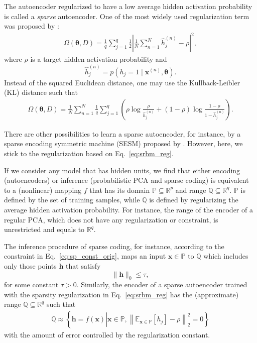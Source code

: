 \documentclass{now}
\newcommand{\vect}[1]{\mathbf{#1}}
\newcommand{\vects}[1]{\boldsymbol{#1}}
\newcommand{\vh}[0]{\vect{h}}
\newcommand{\vx}[0]{\vect{x}}
\newcommand{\TT}[0]{{\vects{\theta}}}
\newcommand{\QQ}[0]{\mathbb{Q}}
\newcommand{\PP}[0]{\mathbb{P}}
\newcommand{\RR}[0]{\mathbb{R}}
\newcommand{\E}[0]{\mathbb{E}}
\begin{document}
The autoencoder regularized to have a low average hidden
activation probability is called a \textit{sparse}
autoencoder. One of the most widely used regularization term
was proposed by \citet{Lee2007}:
\begin{align}
    \label{eq:srbm_reg}
    \Omega(\TT, D) = \frac{1}{q} \sum_{j=1}^q \frac{1}{2} \left|
    \frac{1}{N} \sum_{n=1}^N \hat{h}_j^{(n)} - \rho
    \right|^2,
\end{align}
where $\rho$ is a target hidden activation probability and
\[
\hat{h}_j^{(n)} = p(h_j = 1 \mid \vx^{(n)}, \TT).
\]
Instead of the squared Euclidean distance, one may use the
Kullback-Leibler (KL) distance such that
\begin{align*}
    \Omega(\TT, D) = \frac{1}{N} \sum_{n=1}^N 
    \frac{1}{q} \sum_{j=1}^q \left( \rho \log
    \frac{\rho}{\hat{h}_j^{(n)}} + (1 - \rho) \log \frac{1 -
    \rho}{1 - \hat{h}_j^{(n)}} \right).
\end{align*}

There are other possibilities to learn a sparse autoencoder,
for instance, by a sparse encoding symmetric machine
(SESM)
proposed by \citet{Ranzato2008}. However, here, we stick to
the regularization based on Eq.~\eqref{eq:srbm_reg}.

If we consider any model that has hidden units, we find that
either encoding (autoencoders) or inference (probabilistic
PCA and sparse coding) is equivalent to a (nonlinear)
mapping $f$ that has its domain $\PP \subseteq \RR^p$
and range $\QQ \subseteq \RR^q$. $\PP$ is 
defined by the set of training samples, while $\QQ$ is defined by
regularizing the average hidden activation probability.
For instance, the range of the encoder
of a regular PCA, which does not have any regularization or
constraint, is unrestricted and equals to $\RR^q$.

The inference procedure of sparse
coding, for instance, according to the constraint in
Eq.~\eqref{eq:sp_const_orig}, maps an input $\vx \in \PP$ to
$\QQ$ which includes only those points $\vh$ that satisfy 
\[
\| \vh \|_0 \leq \tau,
\]
for some constant $\tau > 0$. Similarly, the encoder of a
sparse autoencoder trained with the sparsity regularization
in Eq.~\eqref{eq:srbm_reg} has the (approximate) range $\QQ
\subseteq \RR^q$ such that 
\begin{align}
    \label{eq:f_range}
    \QQ \approx \left\{\vh = f(\vx) \left| \vx \in \PP, \left\|
    \E_{\vx \in \PP}\left[ h_j \right] - \rho \right\|_2^2 =
    0 \right.\right\}
\end{align}
with the amount of error controlled by the regularization
constant.
\end{document}
